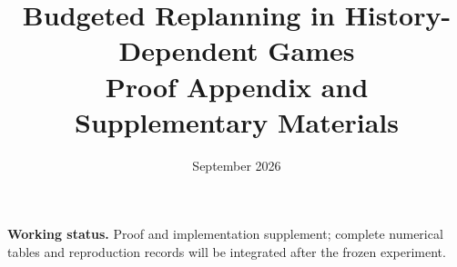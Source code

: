 \documentclass[11pt,a4paper]{article}
\title{Budgeted Replanning in History-Dependent Games\\Proof Appendix and Supplementary Materials}
\author{}
\date{September 2026}
\begin{document}
\maketitle
\noindent\textbf{Working status.} Proof and implementation supplement; complete numerical tables and reproduction records will be integrated after the frozen experiment.



\end{document}
